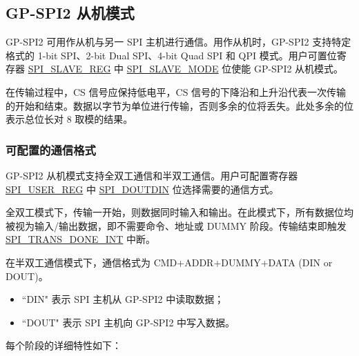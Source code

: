 \documentclass[main\_\_CN.tex]{subfiles}
\begin{document}
\subsection{GP-SPI2 从机模式}\label{sec:gp-spi2-slave-mode}

GP-SPI2 可用作从机与另一 SPI 主机进行通信。用作从机时，GP-SPI2 支持特定格式的 1-bit SPI、2-bit Dual SPI、4-bit Quad SPI 和 QPI 模式。用户可置位寄存器 \hyperref[regdesc:SPISLAVEREG]{SPI\_SLAVE\_REG} 中 \hyperref[fielddesc:SPISLAVEMODE]{SPI\_SLAVE\_MODE} 位使能 GP-SPI2 从机模式。

在传输过程中，CS 信号应保持低电平，CS 信号的下降沿和上升沿代表一次传输的开始和结束。数据以字节为单位进行传输，否则多余的位将丢失。此处多余的位表示总位长对 8 取模的结果。

\subsubsection{可配置的通信格式}\label{slave communication format}

GP-SPI2 从机模式支持全双工通信和半双工通信。用户可配置寄存器 \hyperref[regdesc:SPIUSERREG]{SPI\_USER\_REG} 中 \hyperref[fielddesc:SPIDOUTDIN]{SPI\_DOUTDIN} 位选择需要的通信方式。

全双工模式下，传输一开始，则数据同时输入和输出。在此模式下，所有数据位均被视为输入/输出数据，即不需要命令、地址或 DUMMY 阶段。传输结束即触发 \hyperref[int:SPITRANSDONEINT]{SPI\_TRANS\_DONE\_INT} 中断。

在半双工通信模式下，通信格式为 CMD+ADDR+DUMMY+DATA (DIN or DOUT)。
\begin{itemize}
    \item ``DIN" 表示 SPI 主机从 GP-SPI2 中读取数据；
    \item ``DOUT" 表示 SPI 主机向 GP-SPI2 中写入数据。
\end{itemize}

每个阶段的详细特性如下：
\end{document}
